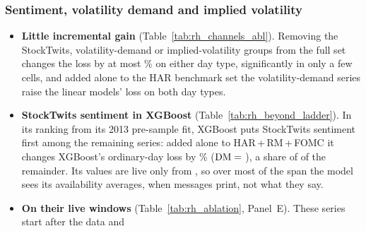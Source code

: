 \subsubsection{Sentiment, volatility demand and implied volatility}
\label{sec:rh_fi_alt}
\begin{itemize}
\item \textbf{Little incremental gain} (Table~\ref{tab:rh_channels_abl}). Removing the StockTwits, volatility-demand
  or implied-volatility groups from the full set changes the loss by at most \rhchAltLoMaxAbs\% on either day type,
  significantly in only a few cells, and added alone to the HAR benchmark set the volatility-demand series raise the
  linear models' loss on both day types.
\item \textbf{StockTwits sentiment in XGBoost} (Table~\ref{tab:rh_beyond_ladder}). In its ranking from its 2013
  pre-sample fit, XGBoost puts StockTwits sentiment first among the remaining series: added alone to HAR\,+\,RM\,+\,FOMC it changes XGBoost's ordinary-day
  loss by \rhbyLXgbKOneOrdPct\% ($\mathrm{DM}={}$\rhbyLXgbKOneOrdDm), a share of \rhbyLXgbKOneOrdR{} of the remainder. Its
  values are live only from \rhabLiveSentStart, so over most of the span the model sees its availability averages,
  when messages print, not what they say.
\item \textbf{On their live windows} (Table~\ref{tab:rh_ablation}, Panel~E). These series start after the data and

\end{itemize}
